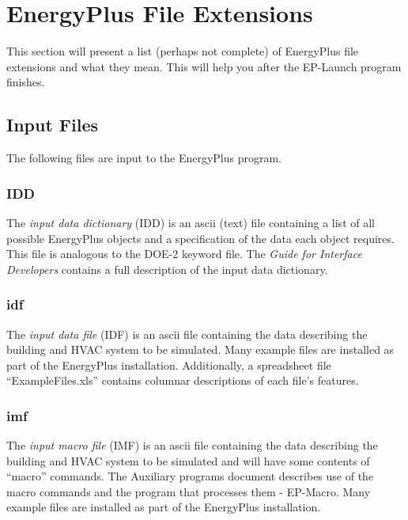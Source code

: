 \section{EnergyPlus File Extensions}\label{energyplus-file-extensions}

This section will present a list (perhaps not complete) of EnergyPlus file extensions and what they mean. This will help you after the EP-Launch program finishes.

\subsection{Input Files}\label{input-files}

The following files are input to the EnergyPlus program.

\subsubsection{IDD}\label{idd}

The \emph{input data dictionary} (IDD) is an ascii (text) file containing a list of all possible EnergyPlus objects and a specification of the data each object requires. This file is analogous to the DOE-2 keyword file. The \emph{Guide for Interface Developers} contains a full description of the input data dictionary.

\subsubsection{idf}\label{idf}

The \emph{input data file} (IDF) is an ascii file containing the data describing the building and HVAC system to be simulated. Many example files are installed as part of the EnergyPlus installation. Additionally, a spreadsheet file ``ExampleFiles.xls'' contains columnar descriptions of each file's features.

\subsubsection{imf}\label{imf}

The \emph{input macro file} (IMF) is an ascii file containing the data describing the building and HVAC system to be simulated and will have some contents of ``macro'' commands. The Auxiliary programs document describes use of the macro commands and the program that processes them - EP-Macro. Many example files are installed as part of the EnergyPlus installation.

